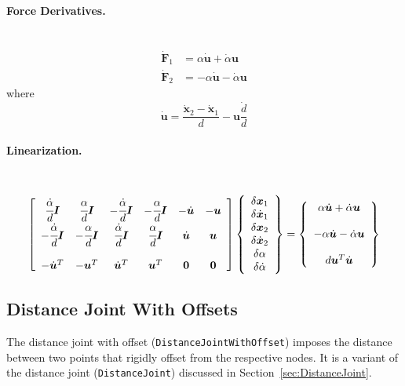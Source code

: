 \documentclass[10pt,fleqn,subeqn]{report}
\newcommand{\T}[1]{\bm{#1}}
\begin{document}
\paragraph{Force Derivatives.} \
\begin{subequations}
\begin{align}
	\dot{\T{F}}_1 &= \alpha \dot{\T{u}} + \dot{\alpha} \T{u} \\
	\dot{\T{F}}_2 &= -\alpha \dot{\T{u}} - \dot{\alpha} \T{u}
\end{align}
\end{subequations}
where
\begin{equation}
	\dot{\T{u}} = \frac{\dot{\T{x}}_2 - \dot{\T{x}}_1}{d} - \T{u} \frac{\dot{d}}{d}
\end{equation}

\paragraph{Linearization.} \
\begin{equation}
        \sqbr{\matr{cccccc}{
		\cfrac{\dot{\alpha}}{d}\T{I} & \cfrac{\alpha}{d}\T{I} &
			-\cfrac{\dot{\alpha}}{d}\T{I} & -\cfrac{\alpha}{d}\T{I} &
			-\dot{\T{u}} & -\T{u} \\
		-\cfrac{\dot{\alpha}}{d}\T{I} & -\cfrac{\alpha}{d}\T{I} &
			\cfrac{\dot{\alpha}}{d}\T{I} & \cfrac{\alpha}{d}\T{I} &
			\dot{\T{u}} & \T{u} \\
		\\
		-\dot{\T{u}}^T & -\T{u}^T & \dot{\T{u}}^T & \T{u}^T & \T{0} & \T{0}
	}}\cubr{\cvvect{
		\delta\T{x}_1 \\
		\delta\dot{\T{x}}_1 \\
		\delta\T{x}_2 \\
		\delta\dot{\T{x}}_2 \\
		\delta\alpha \\
		\delta\dot{\alpha}
	}} = \cubr{\cvvect{
		\alpha \dot{\T{u}} + \dot{\alpha} \T{u} \\
		\\
		-\alpha \dot{\T{u}} - \dot{\alpha} \T{u} \\
		\\
		d \T{u}^T \dot{\T{u}}
	}}
\end{equation}




\subsection{Distance Joint With Offsets}
\label{sec:DistanceJointWithOffset}
The distance joint with offset (\texttt{DistanceJointWithOffset}) 
imposes the distance between two points
that rigidly offset from the respective nodes.
It is a variant of the distance joint (\texttt{DistanceJoint})
discussed in Section~\ref{sec:DistanceJoint}.
\end{document}
